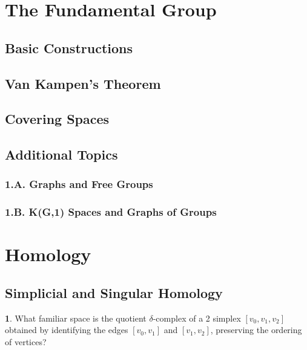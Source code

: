 \documentclass{article}
\begin{document}
\section{The Fundamental Group}

\subsection{Basic Constructions}

\subsection{Van Kampen's Theorem}

\subsection{Covering Spaces}

\subsection*{Additional Topics}

\subsubsection*{1.A. Graphs and Free Groups}

\subsubsection*{1.B. K(G,1) Spaces and Graphs of Groups}

\newpage

\section{Homology}

\subsection{Simplicial and Singular Homology}

\textbf{1}. What familiar space is the quotient $\delta$-complex of a 2 simplex $[v_{0}, v_{1}, v_{2}]$ obtained by identifying the edges $[v_{0}, v_{1}]$ and $[v_{1}, v_{2}]$, preserving the ordering of vertices?
\medskip
\end{document}
